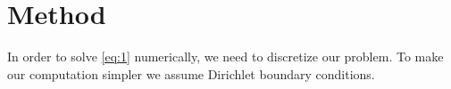 \section*{Method}
In order to solve \ref{eq:1} numerically, we need to discretize our problem. To make our computation simpler we assume Dirichlet boundary conditions.
